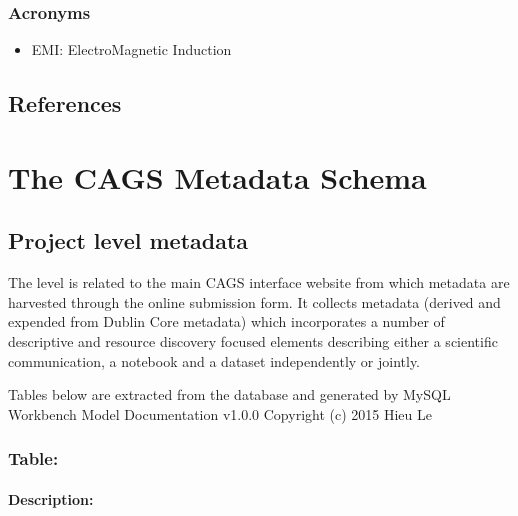 \documentclass[letterpaper,10pt,english]{sphinxmanual}
\begin{document}
\subsection{Acronyms}
\label{\detokenize{glossary:id4}}\begin{itemize}
\item {} 
\sphinxAtStartPar
EMI: ElectroMagnetic Induction

\end{itemize}


\section{References}
\label{\detokenize{glossary:references}}
\sphinxAtStartPar



\chapter{The CAGS Metadata Schema}
\label{\detokenize{schema_documentation:the-cags-metadata-schema}}\label{\detokenize{schema_documentation::doc}}

\section{Project level metadata}
\label{\detokenize{schema_documentation:project-level-metadata}}
\sphinxAtStartPar
The  level is related to the main CAGS interface website from which metadata are harvested through the online submission form. It collects metadata (derived and expended from Dublin Core metadata) which incorporates a number of descriptive and resource discovery focused elements describing either a scientific communication, a notebook and a dataset independently or jointly.

\sphinxAtStartPar
Tables below are extracted from the database and generated by MySQL Workbench Model Documentation v1.0.0 \sphinxhyphen{} Copyright (c)
2015 Hieu Le


\subsection{Table: }
\label{\detokenize{schema_documentation:table-abiotic}}

\subsubsection{Description:}
\label{\detokenize{schema_documentation:description}}
\end{document}
